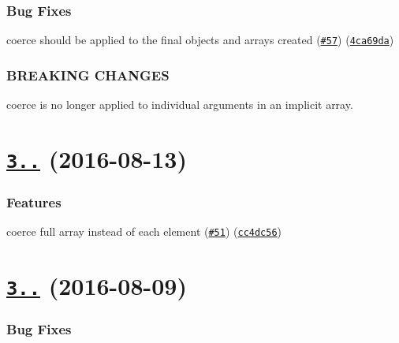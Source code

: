 \subsubsection*{Bug Fixes}


\begin{DoxyItemize}
\item coerce should be applied to the final objects and arrays created (\href{https://github.com/yargs/yargs-parser/issues/57}{\tt \#57}) (\href{https://github.com/yargs/yargs-parser/commit/4ca69da}{\tt 4ca69da})
\end{DoxyItemize}

\subsubsection*{B\+R\+E\+A\+K\+I\+NG C\+H\+A\+N\+G\+ES}


\begin{DoxyItemize}
\item coerce is no longer applied to individual arguments in an implicit array.
\end{DoxyItemize}

\label{_3.2.0}%
 \section*{\href{https://github.com/yargs/yargs-parser/compare/v3.1.0...v3.2.0}{\tt 3..} (2016-\/08-\/13)}

\subsubsection*{Features}


\begin{DoxyItemize}
\item coerce full array instead of each element (\href{https://github.com/yargs/yargs-parser/issues/51}{\tt \#51}) (\href{https://github.com/yargs/yargs-parser/commit/cc4dc56}{\tt cc4dc56})
\end{DoxyItemize}

\label{_3.1.0}%
 \section*{\href{https://github.com/yargs/yargs-parser/compare/v3.0.0...v3.1.0}{\tt 3..} (2016-\/08-\/09)}

\subsubsection*{Bug Fixes}


